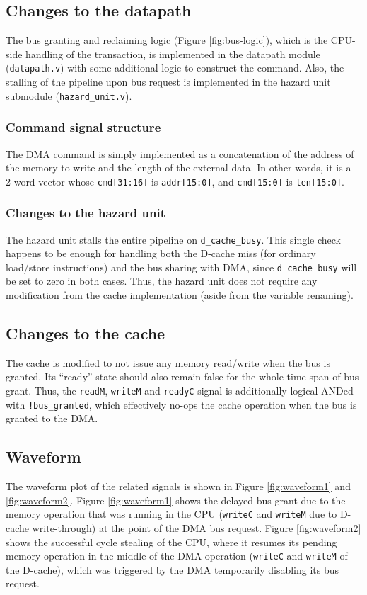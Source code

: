 \documentclass[12pt]{article}
\begin{document}
\subsection{Changes to the datapath}
The bus granting and reclaiming logic (Figure \ref{fig:bus-logic}),
which is the CPU-side handling of the transaction, is implemented in
the datapath module (\verb|datapath.v|) with some additional logic to
construct the command.  Also, the stalling of the pipeline upon bus
request is implemented in the hazard unit submodule
(\verb|hazard_unit.v|).

\subsubsection{Command signal structure}
The DMA command is simply implemented as a concatenation of the
address of the memory to write and the length of the external data.
In other words, it is a 2-word vector whose \verb|cmd[31:16]| is
\verb|addr[15:0]|, and \verb|cmd[15:0]| is \verb|len[15:0]|.

\subsubsection{Changes to the hazard unit}
The hazard unit stalls the entire pipeline on \verb|d_cache_busy|.
This single check happens to be enough for handling both the D-cache
miss (for ordinary load/store instructions) and the bus sharing with
DMA, since \verb|d_cache_busy| will be set to zero in both cases.
Thus, the hazard unit does not require any modification from the cache
implementation (aside from the variable renaming).

\subsection{Changes to the cache}
The cache is modified to not issue any memory read/write when the bus
is granted.  Its ``ready'' state should also remain false for the
whole time span of bus grant.  Thus, the \verb|readM|, \verb|writeM|
and \verb|readyC| signal is additionally logical-ANDed with
\verb|!bus_granted|, which effectively no-ops the cache operation when
the bus is granted to the DMA.

\subsection{Waveform}

The waveform plot of the related signals is shown in Figure
\ref{fig:waveform1} and \ref{fig:waveform2}.  Figure
\ref{fig:waveform1} shows the delayed bus grant due to the memory
operation that was running in the CPU (\verb|writeC| and \verb|writeM|
due to D-cache write-through) at the point of the DMA bus request.
Figure \ref{fig:waveform2} shows the successful cycle stealing of the
CPU, where it resumes its pending memory operation in the middle of
the DMA operation (\verb|writeC| and \verb|writeM| of the D-cache),
which was triggered by the DMA temporarily disabling its bus request.
\end{document}
